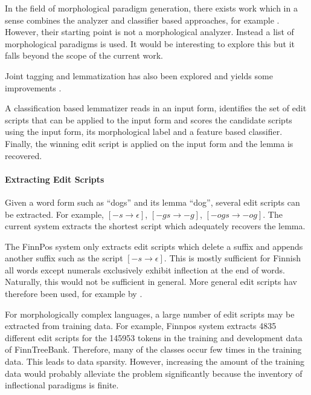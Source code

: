 In the field of morphological paradigm generation, there exists work
which in a sense combines the analyzer and classifier based approaches, for example
\citep{Hulden2014}. However, their starting point is not a morphological
analyzer. Instead a list of morphological paradigms is used. It would
be interesting to explore this but it falls beyond the scope of the
current work.

Joint tagging and lemmatization has also been explored and yields some
improvements \cite{Muller2015}.


A classification based lemmatizer reads in an input form, identifies
the set of edit scripts that can be applied to the input form and
scores the candidate scripts using the input form, its morphological
label and a feature based classifier. Finally, the winning edit script
is applied on the input form and the lemma is recovered.

\paragraph{Extracting Edit Scripts} Given a word form such as ``dogs''
and its lemma ``dog'', several edit scripts can be extracted. For
example, $[-s \rightarrow \epsilon]$, $[-gs \rightarrow -g]$, $[-ogs
\rightarrow -og]$. The current system extracts the shortest script
which adequately recovers the lemma. 

The FinnPos system only extracts edit scripts which delete a suffix
and appends another suffix such as the script $[-s \rightarrow
\epsilon]$. This is mostly sufficient for Finnish all words except numerals
exclusively exhibit inflection at the end of words. Naturally, this would
not be sufficient in general. More general edit scripts hav therefore been used,
for example by \cite{Chrupala2008}.

For morphologically complex languages, a large number of edit
scripts may be extracted from training data. For example, Finnpos
system extracts 4835 different edit scripts for the 145953 tokens in
the training and development data of FinnTreeBank. Therefore, many of
the classes occur few times in the training data. This leads to
data sparsity. However, increasing the amount of the training data
would probably alleviate the problem significantly because the
inventory of inflectional paradigms is finite.

